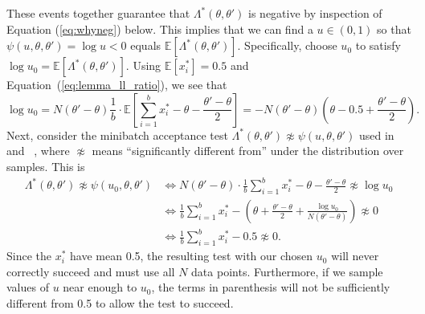 \documentclass[letterpaper]{article}
\newcommand{\mE}{\mathbb{E}}
\begin{document}
These events together guarantee that $\Lambda^*(\theta,\theta')$ is negative by
inspection of Equation (\ref{eq:whyneg}) below.  This implies that we can find a
$u \in (0,1)$ so that $\psi(u,\theta,\theta') = \log u < 0$ equals
$\mE[\Lambda^*(\theta,\theta')]$.  Specifically, choose $u_0$ to satisfy $\log u_0
= \mE[\Lambda^*(\theta,\theta')]$.  Using $\mE[x_i^*] = 0.5$ and
Equation~(\ref{eq:lemma_ll_ratio}), we see that
\begin{equation}\label{eq:whyneg}
    \log u_0 = N(\theta'-\theta)\frac{1}{b} \cdot \mE\left[\sum_{i=1}^b x_i^*-\theta-\frac{\theta'-\theta}{2}\right]
    = -N(\theta'-\theta)\left(\theta-0.5+\frac{\theta'-\theta}{2}\right).
\end{equation}
Next, consider the minibatch acceptance test $\Lambda^*(\theta,\theta')
\not\approx \psi(u,\theta,\theta')$ used in ~\citep{cutting_mh_2014}
and~\citep{icml2014c1_bardenet14} , where $\not\approx$ means ``significantly
different from'' under the distribution over samples. This is
\begin{align}
\Lambda^*(\theta,\theta')  \not\approx \psi(u_0,\theta,\theta') 
&\iff N(\theta'-\theta) \cdot \frac{1}{b}\sum_{i=1}^b x_i^*-\theta-\frac{\theta'-\theta}{2} \not\approx \log u_0\\
&\iff \frac{1}{b}\sum_{i=1}^b x_i^*-\left(\theta+\frac{\theta'-\theta}{2} + \frac{\log u_0}{N(\theta'-\theta)}\right) \not\approx  0 \\
&\iff \frac{1}{b}\sum_{i=1}^b x_i^*-0.5 \not\approx 0. \label{eq:accept_test_zero}
\end{align}
Since the $x_i^*$ have mean 0.5, the resulting test with our chosen $u_0$ will
never correctly succeed and must use all $N$ data points.  Furthermore, if we
sample values of $u$ near enough to $u_0$, the terms in parenthesis will not be
sufficiently different from 0.5 to allow the test to succeed. 
  
\end{document}
